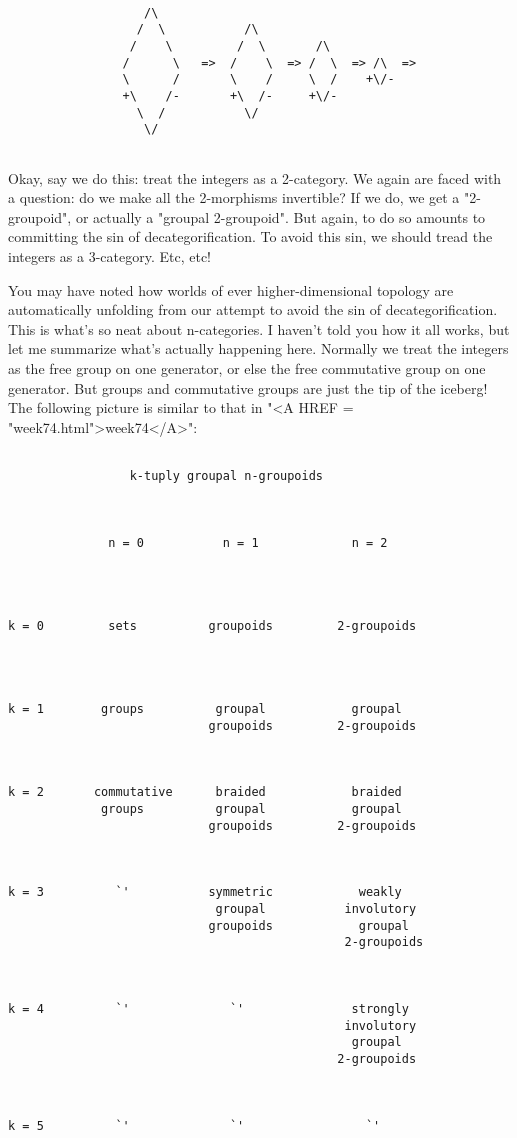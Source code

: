 \begin{verbatim}

                   /\
                  /  \           /\
                 /    \         /  \       /\
                /      \   =>  /    \  => /  \  => /\  =>
                \      /       \    /     \  /    +\/-
                +\    /-       +\  /-     +\/-
                  \  /           \/
                   \/


\end{verbatim}
    
Okay, say we do this: treat the integers as a 2-category.  We again are
faced with a question: do we make all the 2-morphisms invertible?  If we
do, we get a "2-groupoid", or actually a "groupal 2-groupoid".  But
again, to do so amounts to committing the sin of decategorification.  To
avoid this sin, we should tread the integers as a 3-category.  Etc, etc!

You may have noted how worlds of ever higher-dimensional topology are
automatically unfolding from our attempt to avoid the sin of
decategorification.  This is what's so neat about n-categories.  I
haven't told you how it all works, but let me summarize what's actually
happening here.  Normally we treat the integers as the free group on
one generator, or else the free commutative group on one generator.  
But groups and commutative groups are just the tip of the iceberg!
The following picture is similar to that in "<A HREF = "week74.html">week74</A>":


\begin{verbatim}

                 k-tuply groupal n-groupoids



              n = 0           n = 1             n = 2




k = 0         sets          groupoids         2-groupoids
     



k = 1        groups          groupal            groupal
                            groupoids         2-groupoids



k = 2       commutative      braided            braided
             groups          groupal            groupal
                            groupoids         2-groupoids



k = 3          `'           symmetric            weakly
                             groupal           involutory
                            groupoids            groupal 
                                               2-groupoids



k = 4          `'              `'               strongly 
                                               involutory
                                                groupal
                                              2-groupoids



k = 5          `'              `'                 `'


\end{verbatim}
    

